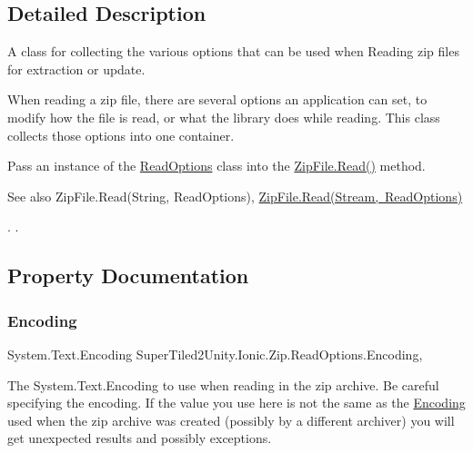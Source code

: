\subsection{Detailed Description}
A class for collecting the various options that can be used when Reading zip files for extraction or update. 

When reading a zip file, there are several options an application can set, to modify how the file is read, or what the library does while reading. This class collects those options into one container. 

Pass an instance of the {\ttfamily \mbox{\hyperlink{class_super_tiled2_unity_1_1_ionic_1_1_zip_1_1_read_options}{Read\+Options}}} class into the {\ttfamily \mbox{\hyperlink{class_super_tiled2_unity_1_1_ionic_1_1_zip_1_1_zip_file_a7b5b9f3c89b0bb19938e5f5b101c8f30}{Zip\+File.\+Read()}}} method. 

\begin{DoxySeeAlso}{See also}
Zip\+File.\+Read(\+String, Read\+Options), \mbox{\hyperlink{class_super_tiled2_unity_1_1_ionic_1_1_zip_1_1_zip_file_a158599d431cb5649f7729fd6f9a1e0af}{Zip\+File.\+Read(\+Stream, Read\+Options)}}


\end{DoxySeeAlso}
. . 

\subsection{Property Documentation}
\mbox{\label{class_super_tiled2_unity_1_1_ionic_1_1_zip_1_1_read_options_ac83fac9bd2d384c0595f87717b66bff3}} 
\subsubsection{\texorpdfstring{Encoding}{Encoding}}
{\footnotesize\ttfamily System.\+Text.\+Encoding Super\+Tiled2\+Unity.\+Ionic.\+Zip.\+Read\+Options.\+Encoding\hspace{0.3cm}{\ttfamily [get]}, {\ttfamily [set]}}



The {\ttfamily System.\+Text.\+Encoding} to use when reading in the zip archive. Be careful specifying the encoding. If the value you use here is not the same as the \mbox{\hyperlink{namespace_super_tiled2_unity_1_1_ionic_1_1_encoding}{Encoding}} used when the zip archive was created (possibly by a different archiver) you will get unexpected results and possibly exceptions. 

